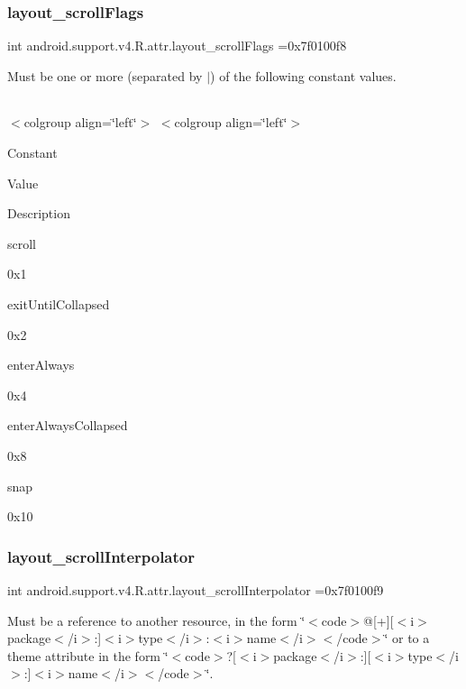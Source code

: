 \subsubsection{\texorpdfstring{layout\+\_\+scroll\+Flags}{layout\_scrollFlags}}
{\footnotesize\ttfamily int android.\+support.\+v4.\+R.\+attr.\+layout\+\_\+scroll\+Flags =0x7f0100f8\hspace{0.3cm}{\ttfamily [static]}}

Must be one or more (separated by \textquotesingle{}$\vert$\textquotesingle{}) of the following constant values.

\tabulinesep=1mm
\begin{longtabu} spread 0pt [c]{*{0}{|X[-1]}|}
\hline
\end{longtabu}
$<$colgroup align=\char`\"{}left\char`\"{}$>$ $<$colgroup align=\char`\"{}left\char`\"{}$>$ 

Constant

Value

Description 

{\ttfamily scroll}

0x1

{\ttfamily exit\+Until\+Collapsed}

0x2

{\ttfamily enter\+Always}

0x4

{\ttfamily enter\+Always\+Collapsed}

0x8

{\ttfamily snap}

0x10\mbox{\label{classandroid_1_1support_1_1v4_1_1R_1_1attr_a879822f9c1ac12993c96e025796ef13d}} 
\subsubsection{\texorpdfstring{layout\+\_\+scroll\+Interpolator}{layout\_scrollInterpolator}}
{\footnotesize\ttfamily int android.\+support.\+v4.\+R.\+attr.\+layout\+\_\+scroll\+Interpolator =0x7f0100f9\hspace{0.3cm}{\ttfamily [static]}}

Must be a reference to another resource, in the form \char`\"{}$<$code$>$@\mbox{[}+\mbox{]}\mbox{[}$<$i$>$package$<$/i$>$\+:\mbox{]}$<$i$>$type$<$/i$>$\+:$<$i$>$name$<$/i$>$$<$/code$>$\char`\"{} or to a theme attribute in the form \char`\"{}$<$code$>$?\mbox{[}$<$i$>$package$<$/i$>$\+:\mbox{]}\mbox{[}$<$i$>$type$<$/i$>$\+:\mbox{]}$<$i$>$name$<$/i$>$$<$/code$>$\char`\"{}. \mbox{\label{classandroid_1_1support_1_1v4_1_1R_1_1attr_aab150bb5cac4951599a91c59ac183ee5}} 
